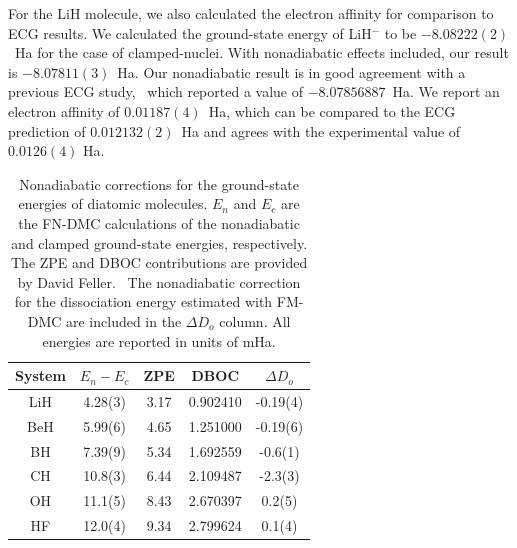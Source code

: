 For the LiH molecule, we also calculated the electron affinity for comparison to ECG results. We calculated the ground-state energy of LiH$^-$ to be $-8.08222(2)$~Ha for the case of clamped-nuclei. With nonadiabatic effects included, our result is  $-8.07811(3)$~Ha. Our nonadiabatic result is in good agreement with a previous ECG study,~\cite{Bubin_LiH-_noBO} which reported a value of $-8.07856887$~Ha. We report an electron affinity of $0.01187(4)$~Ha, which can be compared to the ECG prediction of $0.012132(2)$~Ha and agrees with the experimental value of $0.0126(4)$ Ha.~\cite{switch}

\begin{table}[h]
\centering
\setlength{\extrarowheight}{1pt}
\caption{Nonadiabatic corrections for the ground-state energies of diatomic molecules. $E_n$ and $E_c$ are the FN-DMC calculations of the nonadiabatic and clamped ground-state energies, respectively. The ZPE and DBOC contributions are provided by David Feller.~\cite{fell1} The nonadiabatic correction for the dissociation energy estimated with FM-DMC are included in the $\Delta D_o$ column. All energies are reported in units of mHa.\label{tab:nad-ad-diatomics}}
\begin{tabular}{ccccc}
\hline\hline
System & $E_n-E_c$ &   ZPE &      DBOC & $\Delta D_o$\\ \hline
LiH  &   4.28(3) &  3.17 &  0.902410 & -0.19(4) \\
BeH  &   5.99(6) &  4.65 &  1.251000 & -0.19(6) \\
BH   &   7.39(9) &  5.34 &  1.692559 & -0.6(1) \\
CH   &  10.8(3) &  6.44 &  2.109487  & -2.3(3)  \\
OH   &  11.1(5) &  8.43 &  2.670397  &  0.2(5)  \\
HF   &  12.0(4) &  9.34 &  2.799624  &  0.1(4)  \\
\hline\hline
\end{tabular}
\end{table}

